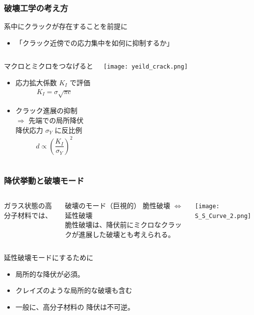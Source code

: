 \documentclass[1４pt, dvipdfmx]{beamer}
\begin{document}
\begin{frame}
\frametitle{破壊工学の考え方}
\begin{exampleblock}{系中にクラックが存在することを前提に}

\begin{itemize}
\item
\alert{「クラック近傍での応力集中を如何に抑制するか」}
\end{itemize}
\end{exampleblock}

\begin{columns}[totalwidth=1\textwidth]
\begin{alertblock}{マクロとミクロをつなげると}
	\begin{itemize}
		\item
		\alert{応力拡大係数 $K_I$ で評価}
		\footnotesize
		\begin{align*}
		K_{I} = \sigma \sqrt{\pi c}
		\end{align*}
		\normalsize
		\item 
		クラック進展の抑制 \\
		$\Rightarrow$ 先端での\alert{局所降伏}\\
		降伏応力 $\sigma_Y$ に反比例
		\footnotesize
		\begin{align*}
		d \propto \left( \dfrac{K_I}{\sigma_Y} \right)^2
		\end{align*}
		\normalsize
	\end{itemize}
\end{alertblock}
	\centering
	\texttt{[image: yeild\_crack.png]}
\end{columns}
\end{frame}

\begin{frame}
\frametitle{降伏挙動と破壊モード}
\begin{columns}[totalwidth=1\textwidth]
ガラス状態の高分子材料では、
\begin{block}{破壊のモード（巨視的）}
脆性破壊 $\Leftrightarrow$ 延性破壊\\
脆性破壊は、降伏前にミクロなクラックが進展した破壊とも考えられる。
\end{block}
	\centering
	\texttt{[image: S\_S\_Curve\_2.png]}
\end{columns}
\begin{exampleblock}{延性破壊モードにするために}
	\begin{itemize}
		\item
		{\color{red} 局所的な降伏}が必須。
		\item
		クレイズのような局所的な破壊も含む
		\item 
		一般に、高分子材料の{\color{red} 降伏は不可逆}。
	\end{itemize}
\end{exampleblock}
\end{frame}
\end{document}
